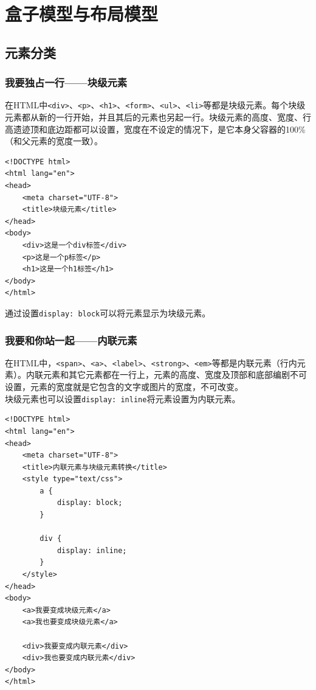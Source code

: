 \chapter{盒子模型与布局模型}

\section{元素分类}

\subsection{我要独占一行——块级元素}

在HTML中\lstinline|<div>|、\lstinline|<p>|、\lstinline|<h1>|、\lstinline|<form>|、\lstinline|<ul>|、\lstinline|<li>|等都是块级元素。每个块级元素都从新的一行开始，并且其后的元素也另起一行。块级元素的高度、宽度、行高遗迹顶和底边距都可以设置，宽度在不设定的情况下，是它本身父容器的100\%（和父元素的宽度一致）。

\begin{lstlisting}[style=htmlcssjs, title=块级元素]
<!DOCTYPE html>
<html lang="en">
<head>
    <meta charset="UTF-8">
    <title>块级元素</title>
</head>
<body>
    <div>这是一个div标签</div>
    <p>这是一个p标签</p>
    <h1>这是一个h1标签</h1>
</body>
</html>
\end{lstlisting}

通过设置\lstinline|display: block|可以将元素显示为块级元素。

\subsection{我要和你站一起——内联元素}

在HTML中，\lstinline|<span>|、\lstinline|<a>|、\lstinline|<label>|、\lstinline|<strong>|、\lstinline|<em>|等都是内联元素（行内元素）。内联元素和其它元素都在一行上，元素的高度、宽度及顶部和底部编剧不可设置，元素的宽度就是它包含的文字或图片的宽度，不可改变。 \\

块级元素也可以设置\lstinline|display: inline|将元素设置为内联元素。

\begin{lstlisting}[style=htmlcssjs, title=内联元素与块级元素转换]
<!DOCTYPE html>
<html lang="en">
<head>
    <meta charset="UTF-8">
    <title>内联元素与块级元素转换</title>
    <style type="text/css">
        a {
            display: block;
        }

        div {
            display: inline;
        }
    </style>
</head>
<body>
    <a>我要变成块级元素</a>
    <a>我也要变成块级元素</a>

    <div>我要变成内联元素</div>
    <div>我也要变成内联元素</div>
</body>
</html>
\end{lstlisting}


